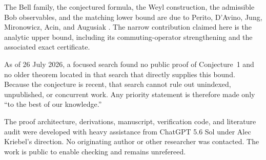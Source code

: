 \documentclass[11pt]{article}
\theoremstyle{remark}
\begin{document}
The Bell family, the conjectured formula, the Weyl construction, the
admissible Bob observables, and the matching lower bound are due to Perito,
D'Avino, Jung, Mironowicz, Acin, and Augusiak
\cite{PeritoEtAl2026}.  The narrow contribution claimed here is the analytic
upper bound, including its commuting-operator strengthening and the associated
exact certificate.

As of 26 July 2026, a focused search found no public proof of Conjecture~1 and
no older theorem located in that search that directly supplies this bound.
Because the conjecture is recent, that search cannot rule out unindexed,
unpublished, or concurrent work.  Any priority statement is therefore made
only ``to the best of our knowledge.''

The proof architecture, derivations, manuscript, verification code, and
literature audit were developed with heavy assistance from ChatGPT 5.6 Sol
under Alec Kriebel's direction.  No originating author or other researcher was
contacted.  The work is public to enable checking and remains unrefereed.
\end{document}
